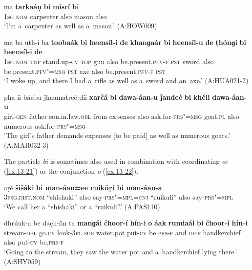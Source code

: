 \begin{exe}
\ex
\label{ex:13-18}
\gll ma \textbf{tarkaáṇ} \textbf{bi} \textbf{misrí} \textbf{bi}  \\
\textsc{1sg.nom} carpenter also mason also \\
\glt `I'm a~carpenter as well as a~mason.' (A:HOW009)

\ex
\label{ex:13-19}
\gll ma ba uth-í ba \textbf{toobaák} \textbf{bi} \textbf{heensíl-i} \textbf{de} \textbf{khanɡaár} \textbf{bi} \textbf{heensíl-u} \textbf{de} \textbf{ṭhónɡi} \textbf{bi} \textbf{heensíl-i} \textbf{de} \\
\textsc{1sg.nom} \textsc{top} stand.up-\textsc{cv} \textsc{top} gun also  be.present.\textsc{pfv-f} \textsc{pst} sword also be.present.\textsc{pfv"=msg } \textsc{pst} axe also be.present.\textsc{pfv-f } \textsc{pst} \\
\glt `I woke up, and there I had a~rifle as well as a~sword and an~axe.' (A:HUA021-2)

\ex
\label{ex:13-20}
\gll pha-íi báabu ǰhaamatreé díi \textbf{xarčá} \textbf{bi} \textbf{dawa-áan-u} \textbf{ǰandeé} \textbf{bi} \textbf{khéli} \textbf{dawa-áan-u}  \\
girl-\textsc{gen} father son.in.law.\textsc{obl} from expenses also  ask.for-\textsc{prs"=msg} goat.\textsc{pl} also numerous ask.for-\textsc{prs"=msg} \\
\glt `The girl's father demands expenses [to be paid] as well as numerous goats.' (A:MAR032-3) 
\end{exe}

The particle \textit{bi} is sometimes also used in combination with coordinating \textit{ee} (\ref{ex:13-21}) or the conjunction \textit{o} (\ref{ex:13-22}).

\begin{exe}
\ex
\label{ex:13-21}
\gll aṛé  \textbf{šišáki} \textbf{ bi man-áan=ee  ruikúṛi bi man-áan-a}\\
\textsc{3fsg.dist.nom} ``shishaki'' also say-\textsc{prs"=mpl=cnj}  ``ruikuli'' also say-\textsc{prs"=mpl}\\
\glt `We call her a ``shishaki'' or a ``ruikuli''.' (A:PAS110)

\ex
\label{ex:13-22}
\gll dhrúuk-a be dac̣h-íin ta \textbf{manɡái} \textbf{čhoor-í} \textbf{hín-i} \textbf{o} \textbf{áak} \textbf{rumiaál} \textbf{bi} \textbf{čhoor-í} \textbf{hín-i}  \\
stream-\textsc{obl} go.\textsc{cv} look-\textsc{3pl} \textsc{sub} water.pot put-\textsc{cv}  be.\textsc{prs-f} and \textsc{idef } handkerchief also put-\textsc{cv} be.\textsc{prs-f } \\
\glt `Going to the stream, they saw the water pot and a~handkerchief lying there.' (A:SHY059) 
\end{exe}

